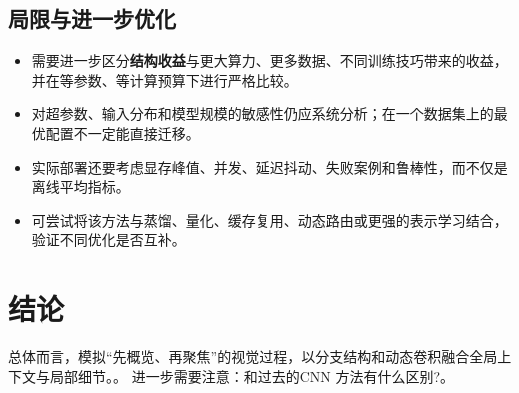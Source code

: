 \documentclass[UTF8,11pt,a4paper]{ctexart}
\newcommand{\term}[1]{\textbf{\textcolor{mainblue}{#1}}}
\begin{document}
\subsection{局限与进一步优化}
\begin{itemize}
\item 需要进一步区分\term{结构收益}与更大算力、更多数据、不同训练技巧带来的收益，并在等参数、等计算预算下进行严格比较。
\item 对超参数、输入分布和模型规模的敏感性仍应系统分析；在一个数据集上的最优配置不一定能直接迁移。
\item 实际部署还要考虑显存峰值、并发、延迟抖动、失败案例和鲁棒性，而不仅是离线平均指标。
\item 可尝试将该方法与蒸馏、量化、缓存复用、动态路由或更强的表示学习结合，验证不同优化是否互补。
\end{itemize}

\section{结论}
总体而言，模拟“先概览、再聚焦”的视觉过程，以分支结构和动态卷积融合全局上下文与局部细节。。 进一步需要注意：和过去的CNN 方法有什么区别?。
\end{document}
